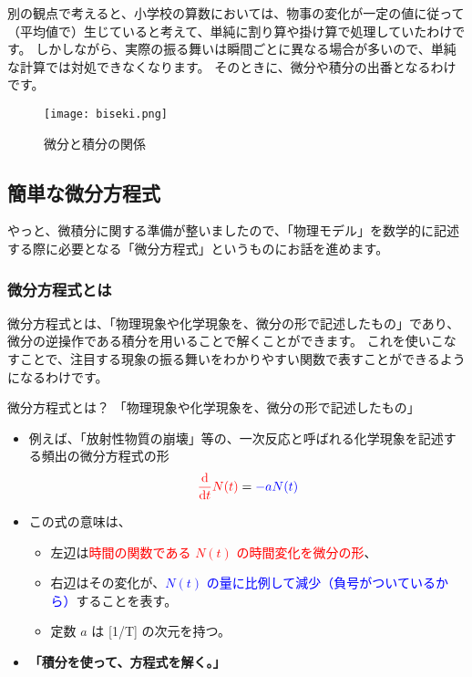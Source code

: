 \documentclass[uplatex,dvipdfmx,a4paper,11pt]{jsarticle}
\begin{document}
別の観点で考えると、小学校の算数においては、物事の変化が一定の値に従って（平均値で）生じていると考えて、単純に割り算や掛け算で処理していたわけです。
しかしながら、実際の振る舞いは瞬間ごとに異なる場合が多いので、単純な計算では対処できなくなります。
そのときに、微分や積分の出番となるわけです。
\begin{figure}[htb]
	\begin{center}
		\texttt{[image: biseki.png]}
		\caption{微分と積分の関係}
		\label{fig:biseki}
	\end{center}
\end{figure}

\subsection{簡単な微分方程式}
やっと、微積分に関する準備が整いましたので、「物理モデル」を数学的に記述する際に必要となる「微分方程式」というものにお話を進めます。

\subsubsection{微分方程式とは}
微分方程式とは、「物理現象や化学現象を、微分の形で記述したもの」であり、微分の逆操作である積分を用いることで解くことができます。
これを使いこなすことで、注目する現象の振る舞いをわかりやすい関数で表すことができるようになるわけです。
\large
	\begin{itembox}[l]{微分方程式とは？}
		「物理現象や化学現象を、微分の形で記述したもの」
			\begin{itemize}
				\item 例えば、「放射性物質の崩壊」等の、一次反応と呼ばれる化学現象を記述する頻出の微分方程式の形
				\begin{align*}
					\textcolor{red}{\dfrac{\mathrm{d}}{\mathrm{d} t} N(t)} = \textcolor{blue}{-aN(t)}
				\end{align*}
				\item この式の意味は、
				\begin{itemize}
					\item 左辺は\textcolor{red}{時間の関数である $N(t)$ の時間変化を微分の形}、
					\item 右辺はその変化が、\textcolor{blue}{$N(t)$ の量に比例して減少（負号がついているから）}することを表す。
					\item 定数 $a$ は [1/T] の次元を持つ。
				\end{itemize}
				\item \textbf{「積分を使って、方程式を解く。」}
			\end{itemize}
	\end{itembox}
\normalsize
\end{document}
